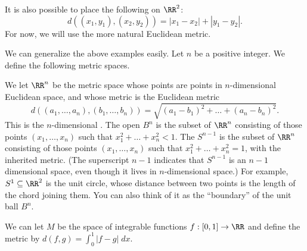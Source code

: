 \begin{example}[Taxicab on $\RR^2$]
	It is also possible to place the following  on $\RR^2$:
	\[ d\left( (x_1, y_1), (x_2, y_2) \right) = 
		\left\lvert x_1-x_2 \right\rvert + \left\lvert y_1-y_2 \right\rvert.
		\]
	For now, we will use the more natural Euclidean metric.
\end{example}

\begin{example}
	We can generalize the above examples easily.
	Let $n$ be a positive integer. We define the following metric spaces.
	\begin{enumerate}[(a)]
		\ii We let $\RR^n$ be the metric space whose points are points in $n$-dimensional Euclidean space,
		and whose metric is the Euclidean metric
		\[
			d\left( 
			\left( a_1, \dots, a_n \right), \left( b_1, \dots, b_n \right)
			\right)
			= \sqrt{(a_1-b_1)^2 + \dots + (a_n-b_n)^2}.
		\]
		This is the $n$-dimensional .
		\ii The open  $B^{n}$ is the subset of $\RR^n$
		consisting of those points $\left( x_1, \dots, x_n \right)$
		such that $x_1^2 + \dots + x_n^2 < 1$.
		\ii The  $S^{n-1}$ is the subset of $\RR^n$
		consisting of those points $\left( x_1, \dots, x_n \right)$
		such that $x_1^2 + \dots + x_n^2 = 1$, with the inherited metric.
		(The superscript $n-1$ indicates that $S^{n-1}$ is an $n-1$ dimensional space,
		even though it lives in $n$-dimensional space.)
		For example, $S^1 \subseteq \RR^2$ is the unit circle,
		whose distance between two points is the length of the chord joining them.
		You can also think of it as the ``boundary'' of the unit ball $B^n$.
	\end{enumerate}
\end{example}
\begin{example}
	 We can let $M$ be the space of
	integrable functions $f : [0,1] \to \RR$ and define the metric
	by $d(f,g) = \int_0^1 \left\lvert f-g \right\rvert \; dx$.
\end{example}

